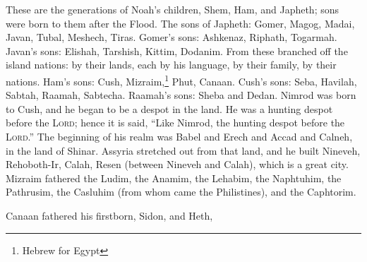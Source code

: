 
\begin{inparaenum}
     These are the generations of Noah's children, Shem, Ham, and Japheth; sons were born to them after the Flood.%
     The sons of Japheth: Gomer, Magog, Madai, Javan, Tubal, Meshech, Tiras.%
     Gomer's sons: Ashkenaz, Riphath, Togarmah.%
     Javan's sons: Elishah, Tarshish, Kittim, Dodanim.%
     From these branched off the island nations: by their lands, each by his language, by their family, by their nations.%
     Ham's sons: Cush, Mizraim,\footnote{Hebrew for Egypt} Phut, Canaan.%
     Cush's sons: Seba, Havilah, Sabtah, Raamah, Sabtecha. Raamah's sons: Sheba and Dedan.%
     Nimrod was born to Cush, and he began to be a despot in the land.%
     He was a hunting despot before the \textsc{Lord}; hence it is said, ``Like Nimrod, the hunting despot before the \textsc{Lord}.''%
     The beginning of his realm was Babel and Erech and Accad and Calneh, in the land of Shinar.%
     Assyria stretched out from that land, and he built Nineveh, Rehoboth-Ir, Calah,%
     Resen (between Nineveh and Calah), which is a great city.%
     Mizraim fathered the Ludim, the Anamim, the Lehabim, the Naphtuhim,%
     the Pathrusim, the Casluhim (from whom came the Philistines), and the Caphtorim.%
    
     Canaan fathered his firstborn, Sidon, and Heth,%
    
\end{inparaenum}

